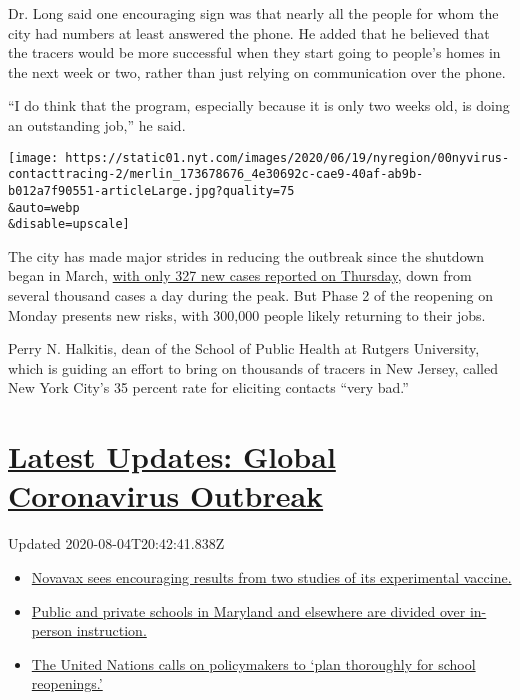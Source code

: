 Dr. Long said one encouraging sign was that nearly all the people for
whom the city had numbers at least answered the phone. He added that he
believed that the tracers would be more successful when they start going
to people's homes in the next week or two, rather than just relying on
communication over the phone.

``I do think that the program, especially because it is only two weeks
old, is doing an outstanding job,'' he said.

\texttt{[image: https://static01.nyt.com/images/2020/06/19/nyregion/00nyvirus-contacttracing-2/merlin\_173678676\_4e30692c-cae9-40af-ab9b-b012a7f90551-articleLarge.jpg?quality=75\\\&auto=webp\\\&disable=upscale]}

The city has made major strides in reducing the outbreak since the
shutdown began in March,
\href{https://www.nytimes.com/interactive/2020/nyregion/new-york-city-coronavirus-cases.html\#cases}{with
only 327 new cases reported on Thursday}, down from several thousand
cases a day during the peak. But Phase 2 of the reopening on Monday
presents new risks, with 300,000 people likely returning to their jobs.

Perry N. Halkitis, dean of the School of Public Health at Rutgers
University, which is guiding an effort to bring on thousands of tracers
in New Jersey, called New York City's 35 percent rate for eliciting
contacts ``very bad.''

\hypertarget{latest-updates-global-coronavirus-outbreak}{%
\section{\texorpdfstring{\href{https://www.nytimes.com/2020/08/04/world/coronavirus-cases.html?action=click\&pgtype=Article\&state=default\&region=MAIN_CONTENT_1\&context=storylines_live_updates}{Latest
Updates: Global Coronavirus
Outbreak}}{Latest Updates: Global Coronavirus Outbreak}}\label{latest-updates-global-coronavirus-outbreak}}

Updated 2020-08-04T20:42:41.838Z

\begin{itemize}
\tightlist
\item
  \href{https://www.nytimes.com/2020/08/04/world/coronavirus-cases.html?action=click\&pgtype=Article\&state=default\&region=MAIN_CONTENT_1\&context=storylines_live_updates\#link-1228a480}{Novavax
  sees encouraging results from two studies of its experimental
  vaccine.}
\item
  \href{https://www.nytimes.com/2020/08/04/world/coronavirus-cases.html?action=click\&pgtype=Article\&state=default\&region=MAIN_CONTENT_1\&context=storylines_live_updates\#link-4825b93}{Public
  and private schools in Maryland and elsewhere are divided over
  in-person instruction.}
\item
  \href{https://www.nytimes.com/2020/08/04/world/coronavirus-cases.html?action=click\&pgtype=Article\&state=default\&region=MAIN_CONTENT_1\&context=storylines_live_updates\#link-50f7386d}{The
  United Nations calls on policymakers to `plan thoroughly for school
  reopenings.'}
\end{itemize}

